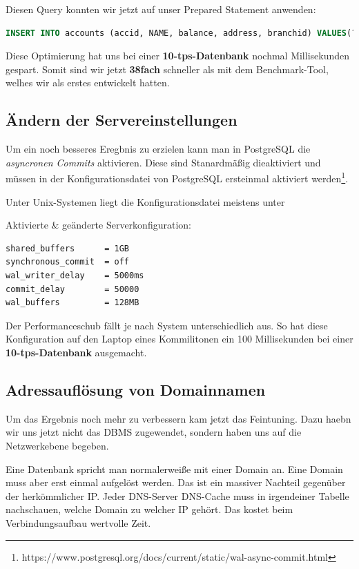 Diesen Query konnten wir jetzt auf unser Prepared Statement anwenden:
\begin{lstlisting}[language=sql]
INSERT INTO accounts (accid, NAME, balance, address, branchid) VALUES(?, 'account', 0,'test', trunc(random() * n + 1))
\end{lstlisting}

Diese Optimierung  hat uns bei einer \textbf{10-tps-Datenbank} nochmal  Millisekunden gespart. Somit sind wir jetzt \textbf{38fach} schneller 
als mit dem Benchmark-Tool, welhes wir als erstes entwickelt hatten.


\subsection{Ändern der Servereinstellungen}

Um ein noch besseres Eregbnis zu erzielen kann man in PostgreSQL die
\textit{asyncronen Commits} aktivieren. Diese sind Stanardmäßig dieaktiviert und
müssen in der Konfigurationsdatei von PostgreSQL ersteinmal aktiviert werden\footnote{https://www.postgresql.org/docs/current/static/wal-async-commit.html}.

Unter Unix-Systemen liegt die Konfigurationsdatei meistens unter \newline
{}

Aktivierte \& geänderte Serverkonfiguration:
\begin{lstlisting}
shared_buffers		= 1GB
synchronous_commit	= off
wal_writer_delay	= 5000ms
commit_delay		= 50000
wal_buffers			= 128MB
\end{lstlisting}

Der Performanceschub fällt je nach System unterschiedlich aus. So hat diese
Konfiguration auf den Laptop eines Kommilitonen ein 100 Millisekunden bei einer
\textbf{10-tps-Datenbank} ausgemacht.

\subsection{Adressauflösung von Domainnamen}
Um das Ergebnis noch mehr zu verbessern kam jetzt das Feintuning. Dazu
haebn wir uns jetzt nicht das DBMS zugewendet, sondern haben uns auf die Netzwerkebene begeben.

Eine Datenbank spricht man normalerweiße mit einer Domain an. 
Eine Domain muss aber erst einmal aufgelöst werden.
Das ist ein massiver Nachteil gegenüber der herkömmlicher IP. Jeder
DNS-Server \bzw DNS-Cache muss in irgendeiner Tabelle nachschauen, welche Domain
zu welcher IP gehört. Das kostet beim Verbindungsaufbau wertvolle Zeit.

